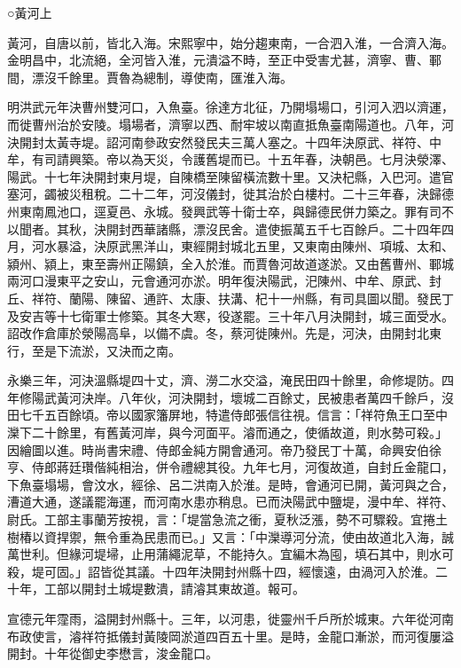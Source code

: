 

○黃河上

黃河，自唐以前，皆北入海。宋熙寧中，始分趨東南，一合泗入淮，一合濟入海。金明昌中，北流絕，全河皆入淮，元潰溢不時，至正中受害尤甚，濟寧、曹、鄆間，漂沒千餘里。賈魯為總制，導使南，匯淮入海。

明洪武元年決曹州雙河口，入魚臺。徐達方北征，乃開塌場口，引河入泗以濟運，而徙曹州治於安陵。塌場者，濟寧以西、耐牢坡以南直抵魚臺南陽道也。八年，河決開封太黃寺堤。詔河南參政安然發民夫三萬人塞之。十四年決原武、祥符、中牟，有司請興築。帝以為天災，令護舊堤而已。十五年春，決朝邑。七月決滎澤、陽武。十七年決開封東月堤，自陳橋至陳留橫流數十里。又決杞縣，入巴河。遣官塞河，蠲被災租稅。二十二年，河沒儀封，徙其治於白樓村。二十三年春，決歸德州東南鳳池口，逕夏邑、永城。發興武等十衛士卒，與歸德民併力築之。罪有司不以聞者。其秋，決開封西華諸縣，漂沒民舍。遣使振萬五千七百餘戶。二十四年四月，河水暴溢，決原武黑洋山，東經開封城北五里，又東南由陳州、項城、太和、潁州、潁上，東至壽州正陽鎮，全入於淮。而賈魯河故道遂淤。又由舊曹州、鄆城兩河口漫東平之安山，元會通河亦淤。明年復決陽武，汜陳州、中牟、原武、封丘、祥符、蘭陽、陳留、通許、太康、扶溝、杞十一州縣，有司具圖以聞。發民丁及安吉等十七衛軍士修築。其冬大寒，役遂罷。三十年八月決開封，城三面受水。詔改作倉庫於滎陽高阜，以備不虞。冬，蔡河徙陳州。先是，河決，由開封北東行，至是下流淤，又決而之南。

永樂三年，河決溫縣堤四十丈，濟、澇二水交溢，淹民田四十餘里，命修堤防。四年修陽武黃河決岸。八年伙，河決開封，壞城二百餘丈，民被患者萬四千餘戶，沒田七千五百餘頃。帝以國家籓屏地，特遣侍郎張信往視。信言：「祥符魚王口至中灤下二十餘里，有舊黃河岸，與今河面平。濬而通之，使循故道，則水勢可殺。」因繪圖以進。時尚書宋禮、侍郎金純方開會通河。帝乃發民丁十萬，命興安伯徐亨、侍郎蔣廷瓚偕純相治，併令禮總其役。九年七月，河復故道，自封丘金龍口，下魚臺塌場，會汶水，經徐、呂二洪南入於淮。是時，會通河已開，黃河與之合，漕道大通，遂議罷海運，而河南水患亦稍息。已而決陽武中鹽堤，漫中牟、祥符、尉氏。工部主事蘭芳按視，言：「堤當急流之衝，夏秋泛漲，勢不可驟殺。宜捲土樹椿以資捍禦，無令重為民患而已。」又言：「中灤導河分流，使由故道北入海，誠萬世利。但緣河堤埽，止用蒲繩泥草，不能持久。宜編木為囤，填石其中，則水可殺，堤可固。」詔皆從其議。十四年決開封州縣十四，經懷遠，由渦河入於淮。二十年，工部以開封土城堤數潰，請濬其東故道。報可。

宣德元年霪雨，溢開封州縣十。三年，以河患，徙靈州千戶所於城東。六年從河南布政使言，濬祥符抵儀封黃陵岡淤道四百五十里。是時，金龍口漸淤，而河復屢溢開封。十年從御史李懋言，浚金龍口。

